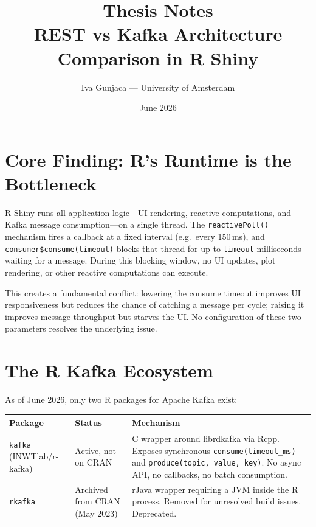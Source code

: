 \documentclass[11pt,a4paper]{article}
\title{Thesis Notes\\[4pt]\large REST vs Kafka Architecture Comparison in R Shiny}
\author{Iva Gunjaca — University of Amsterdam}
\date{June 2026}
\begin{document}
\maketitle

\section{Core Finding: R's Runtime is the Bottleneck}

R Shiny runs all application logic---UI rendering, reactive computations,
and Kafka message consumption---on a single thread. The \texttt{reactivePoll()}
mechanism fires a callback at a fixed interval (e.g.\ every 150\,ms), and
\texttt{consumer\$consume(timeout)} blocks that thread for up to
\texttt{timeout} milliseconds waiting for a message. During this blocking
window, no UI updates, plot rendering, or other reactive computations can
execute.

This creates a fundamental conflict: lowering the consume timeout improves
UI responsiveness but reduces the chance of catching a message per cycle;
raising it improves message throughput but starves the UI. No configuration
of these two parameters resolves the underlying issue.

\section{The R Kafka Ecosystem}

As of June 2026, only two R packages for Apache Kafka exist:

\begin{tabularx}{\textwidth}{@{}llX@{}}
\toprule
\textbf{Package} & \textbf{Status} & \textbf{Mechanism} \\
\midrule
\texttt{kafka} (INWTlab/r-kafka) & Active, not on CRAN &
  C wrapper around librdkafka via Rcpp. Exposes synchronous
  \texttt{consume(timeout\_ms)} and \texttt{produce(topic, value, key)}.
  No async API, no callbacks, no batch consumption. \\
\texttt{rkafka} & Archived from CRAN (May 2023) &
  rJava wrapper requiring a JVM inside the R process.
  Removed for unresolved build issues. Deprecated. \\
\bottomrule
\end{tabularx}
\end{document}
